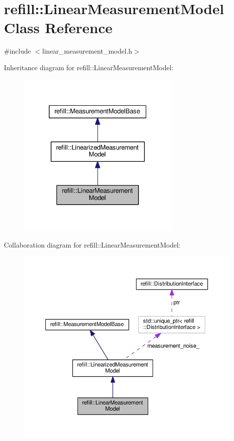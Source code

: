 \hypertarget{classrefill_1_1LinearMeasurementModel}{}\section{refill\+:\+:Linear\+Measurement\+Model Class Reference}
\label{classrefill_1_1LinearMeasurementModel}


{\ttfamily \#include $<$linear\+\_\+measurement\+\_\+model.\+h$>$}



Inheritance diagram for refill\+:\+:Linear\+Measurement\+Model\+:\nopagebreak
\begin{figure}[H]
\begin{center}
\leavevmode
\includegraphics[width=229pt]{classrefill_1_1LinearMeasurementModel__inherit__graph}
\end{center}
\end{figure}


Collaboration diagram for refill\+:\+:Linear\+Measurement\+Model\+:\nopagebreak
\begin{figure}[H]
\begin{center}
\leavevmode
\includegraphics[width=350pt]{classrefill_1_1LinearMeasurementModel__coll__graph}
\end{center}
\end{figure}
